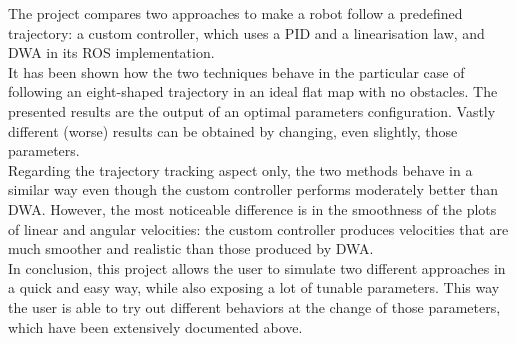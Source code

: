 \documentclass[11pt,a4paper]{article}
\begin{document}
The project compares two approaches to make a robot follow a predefined trajectory: a custom controller,
which uses a PID and a linearisation law, and DWA in its ROS implementation.\\

It has been shown how the two techniques behave in the particular case of following an eight-shaped trajectory
in an ideal flat map with no obstacles.
The presented results are the output of an optimal parameters configuration.
Vastly different (worse) results can be obtained by changing, even slightly, those parameters.\\

Regarding the trajectory tracking aspect only, the two methods behave in a similar way even though the custom
controller performs moderately better than DWA.
However, the most noticeable difference is in the smoothness of the plots of linear and angular velocities:
the custom controller produces velocities that are much smoother and realistic than those produced by DWA.\\

In conclusion, this project allows the user to simulate two different approaches in a quick and easy way,
while also exposing a lot of tunable parameters.
This way the user is able to try out different behaviors at the change of those parameters, which have
been extensively documented above.
\end{document}

